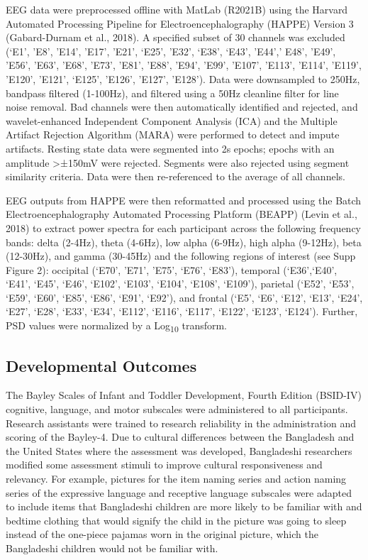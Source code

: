 \documentclass{article}
\begin{document}
EEG data were preprocessed offline with MatLab (R2021B) using the Harvard Automated Processing Pipeline for Electroencephalography (HAPPE) Version 3 (Gabard-Durnam et al., 2018).
A specified subset of 30 channels was excluded (‘E1’, ’E8’, ’E14’, ’E17’, ’E21’, ‘E25’, ’E32’, ‘E38’, ‘E43’, ’E44’,’ E48’, ’E49’, ’E56’, ’E63’, ’E68’, ’E73’, ’E81’, ’E88’, ’E94’, ’E99’, ’E107’, ’E113’, ’E114’, ’E119’, ’E120’, ’E121’, ‘E125', 'E126', 'E127', 'E128').
Data were downsampled to 250Hz, bandpass filtered (1-100Hz), and filtered using a 50Hz cleanline filter for line noise removal.
Bad channels were then automatically identified and rejected, and wavelet-enhanced Independent Component Analysis (ICA) and the Multiple Artifact Rejection Algorithm (MARA) were performed to detect and impute artifacts.
Resting state data were segmented into 2s epochs; epochs with an amplitude >±150mV were rejected.
Segments were also rejected using segment similarity criteria.
Data were then re-referenced to the average of all channels.

EEG outputs from HAPPE were then reformatted and processed using the Batch Electroencephalography Automated Processing Platform (BEAPP) (Levin et al., 2018) to extract power spectra for each participant across the following frequency bands: delta (2-4Hz), theta (4-6Hz), low alpha (6-9Hz), high alpha (9-12Hz), beta (12-30Hz), and gamma (30-45Hz) and the following regions of interest (see Supp Figure 2): occipital (‘E70’, ’E71’, ’E75’, ‘E76’, ‘E83’), temporal (‘E36’,‘E40’, ‘E41’, ‘E45’, ‘E46’, ‘E102’, ‘E103’, ‘E104’, ‘E108’, ‘E109’), parietal (‘E52’, ‘E53’, ‘E59’, ‘E60’, ‘E85’, ‘E86’, ‘E91’, ‘E92’), and frontal (‘E5’, ‘E6’, ‘E12’, ‘E13’, ‘E24’, ‘E27’, ‘E28’, ‘E33’, ‘E34’, ‘E112’, ‘E116’, ‘E117’, ‘E122’, ‘E123’, ‘E124’).
Further, PSD values were normalized by a Log\textsubscript{10} transform.

\subsection*{Developmental Outcomes} 
The Bayley Scales of Infant and Toddler Development, Fourth Edition (BSID-IV) cognitive, language, and motor subscales were administered to all participants.
Research assistants were trained to research reliability in the administration and scoring of the Bayley-4.
Due to cultural differences between the Bangladesh and the United States where the assessment was developed, Bangladeshi researchers modified some assessment stimuli to improve cultural responsiveness and relevancy.
For example, pictures for the item naming series and action naming series of the expressive language and receptive language subscales were adapted to include items that Bangladeshi children are more likely to be familiar with and bedtime clothing that would signify the child in the picture was going to sleep instead of the one-piece pajamas worn in the original picture, which the Bangladeshi children would not be familiar with. 
\end{document}
